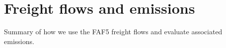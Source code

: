 \section{Freight flows and emissions}
Summary of how we use the FAF5 freight flows and evaluate associated emissions.